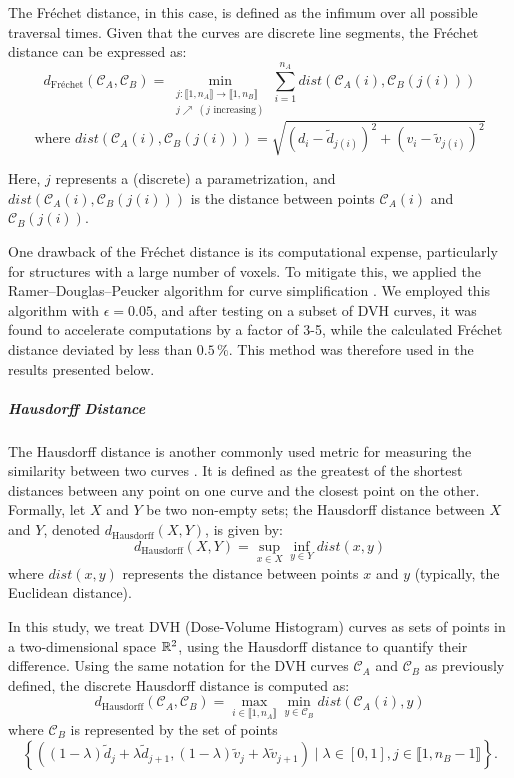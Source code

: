 The Fréchet distance, in this case, is defined as the infimum over all possible traversal times.
Given that the curves are discrete line segments, the Fréchet distance can be expressed as:
$$d_{\text{Fréchet}}(\mathcal{C}_A, \mathcal{C}_B) = \min_{\substack{j: \llbracket 1, n_A \rrbracket \to \llbracket 1, n_B \rrbracket \\ j \nearrow \ (j \text{ increasing})}} \sum_{i=1}^{n_A} dist\left( \mathcal{C}_A(i), \mathcal{C}_B(j(i)) \right)$$
$$\text{where } dist\left( \mathcal{C}_A(i), \mathcal{C}_B(j(i)) \right) = \sqrt{(d_i-\tilde{d}_{j(i)})^2 + (v_i-\tilde{v}_{j(i)})^2}$$

Here, $j$ represents a (discrete) a parametrization, and $dist\left( \mathcal{C}_A(i), \mathcal{C}_B(j(i)) \right)$ is the distance between points $\mathcal{C}_A(i)$ and $\mathcal{C}_B(j(i))$.

One drawback of the Fréchet distance is its computational expense, particularly for structures with a large number of voxels.
To mitigate this, we applied the Ramer–Douglas–Peucker algorithm for curve simplification \cite{PRASAD2012843}.
We employed this algorithm with $\epsilon=0.05$, and after testing on a subset of DVH curves, it was found to accelerate computations by a factor of 3-5, while the calculated Fréchet distance deviated by less than $0.5\,\%$.
This method was therefore used in the results presented below.


\subparagraph{Hausdorff Distance}
The Hausdorff distance is another commonly used metric for measuring the similarity between two curves \cite{Henrikson1999CompletenessAT}.
It is defined as the greatest of the shortest distances between any point on one curve and the closest point on the other.
Formally, let $X$ and $Y$ be two non-empty sets;
the Hausdorff distance between $X$ and $Y$, denoted $d_\text{Hausdorff}(X, Y)$, is given by:
$$d_\text{Hausdorff}(X, Y) = \sup_{x \in X}\inf_{y \in Y} {dist(x, y)}$$
where $dist(x, y)$ represents the distance between points $x$ and $y$ (typically, the Euclidean distance).

In this study, we treat DVH (Dose-Volume Histogram) curves as sets of points in a two-dimensional space $\mathbb{R}^2$, using the Hausdorff distance to quantify their difference.
Using the same notation for the DVH curves $\mathcal{C}_A$ and $\mathcal{C}_B$ as previously defined, the discrete Hausdorff distance is computed as:
$$d_\text{Hausdorff}(\mathcal{C}_A, \mathcal{C}_B) = \max_{i \in \llbracket 1,n_A \rrbracket} \min_{y \in \mathcal{C}_B} {dist(\mathcal{C}_A(i), y)}$$
where $\mathcal{C}_B$ is represented by the set of points
$$\left\lbrace \left( (1-\lambda) \tilde{d}_j + \lambda \tilde{d}_{j+1}, (1-\lambda) \tilde{v}_j + \lambda \tilde{v}_{j+1} \right) \mid \lambda \in \left[ 0,1 \right], j \in \llbracket 1, n_B-1 \rrbracket \right\rbrace.$$

